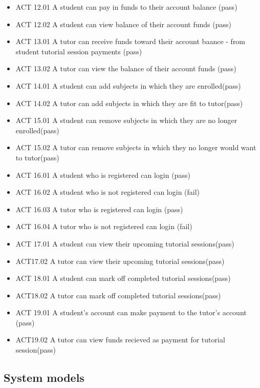 \documentclass[12pt]{article}
\begin{document}
\begin{itemize}
\item ACT 12.01 A student can pay in funds to their account balance (pass)
\item ACT 12.02 A student can view balance of their account funds (pass)
\item ACT 13.01 A tutor can receive funds toward their account baance - from student tutorial session payments (pass)
\item ACT 13.02 A tutor can view the balance of their account funds (pass)
\item ACT 14.01 A student can add subjects in which they are enrolled(pass)
\item ACT 14.02 A tutor can add subjects in which they are fit to tutor(pass)
\item ACT 15.01 A student can remove subjects in which they are no longer enrolled(pass)
\item ACT 15.02 A tutor can remove subjects in which they no longer would want to tutor(pass)
\item ACT 16.01 A student who is registered can login (pass)
\item ACT 16.02 A student who is not registered can login (fail)
\item ACT 16.03 A tutor who is registered can login (pass)
\item ACT 16.04 A tutor who is not registered can login (fail)
\item ACT 17.01 A student can view their upcoming tutorial sessions(pass)
\item ACT17.02	A tutor can view their upcoming tutorial sessions(pass)
\item ACT 18.01 A student can mark off completed tutorial sessions(pass)
\item ACT18.02	A tutor can mark off completed tutorial sessions(pass)
\item ACT 19.01 A student's account can make payment to the tutor's account (pass)
\item ACT19.02	A tutor can view funds recieved as payment for tutorial session(pass)
\end{itemize}

\subsection{System models}
\end{document}
